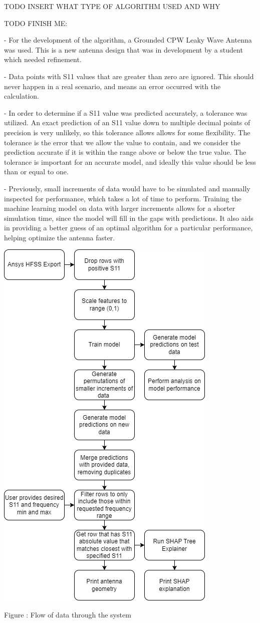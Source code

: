 \documentclass[11pt, notitlepage]{article}
\newcounter{figure_counter}
\newcommand\figuretitle{\addtocounter{figure_counter}{1}Figure \arabic{figure_counter}: }
\begin{document}
\begin{multicols}{2}
TODO INSERT WHAT TYPE OF ALGORITHM USED AND WHY

TODO  FINISH ME:

- For the development of the algorithm, a Grounded CPW Leaky Wave Antenna was used. This is a new antenna design that was in development by a student which needed refinement.

- Data points with S11 values that are greater than zero are ignored. This should never happen in a real scenario, and means an error occurred with the calculation.

- In order to determine if a S11 value was predicted accurately, a tolerance was utilized. An exact prediction of an S11 value down to multiple decimal points of precision is very unlikely, so this tolerance allows allows for some flexibility. The tolerance is the error that we allow the value to contain, and we consider the prediction accurate if it is within the range above or below the true value. The tolerance is important for an accurate model, and ideally this value should be less than or equal to one.

- Previously, small increments of data would have to be simulated and manually inspected for performance, which takes a lot of time to perform. Training the machine learning model on data with larger increments allows for a shorter simulation time, since the model will fill in the gaps with predictions. It also aids in providing a better guess of an optimal algorithm for a particular performance, helping optimize the antenna faster. 

\begin{center}
  \includegraphics[width=.5\textwidth]{methodology}
  \figuretitle Flow of data through the system
\end{center}


\end{multicols}
\end{document}

